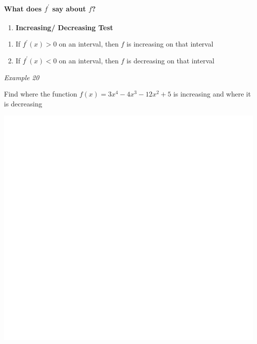 \documentclass[]{book}
\providecommand{\tightlist}{%
  \setlength{\itemsep}{0pt}\setlength{\parskip}{0pt}}
\let\oldparagraph\paragraph
\renewcommand{\paragraph}[1]{\oldparagraph{#1}\mbox{}}
\begin{document}
\hypertarget{what-does-fprime-say-about-f}{%
\paragraph{\texorpdfstring{What does \(f^\prime\) say about \(f\)?}{What does f\^{}\textbackslash{}prime say about f?}}\label{what-does-fprime-say-about-f}}

\begin{enumerate}
\def\labelenumi{\arabic{enumi}.}
\tightlist
\item
  \textbf{Increasing/ Decreasing Test}
\end{enumerate}

\begin{enumerate}
\def\labelenumi{(\alph{enumi})}
\tightlist
\item
  If \(f^\prime (x) >0\) on an interval, then \(f\) is increasing on that interval
\item
  If \(f^\prime (x) <0\) on an interval, then \(f\) is decreasing on that interval
\end{enumerate}

\emph{Example 20}

Find where the function \(f(x)=3x^4-4x^3- 12x^2+5\) is increasing and where it is decreasing

\begin{center}\includegraphics[width=1\linewidth]{figure/LB35-1} \end{center}
\end{document}
